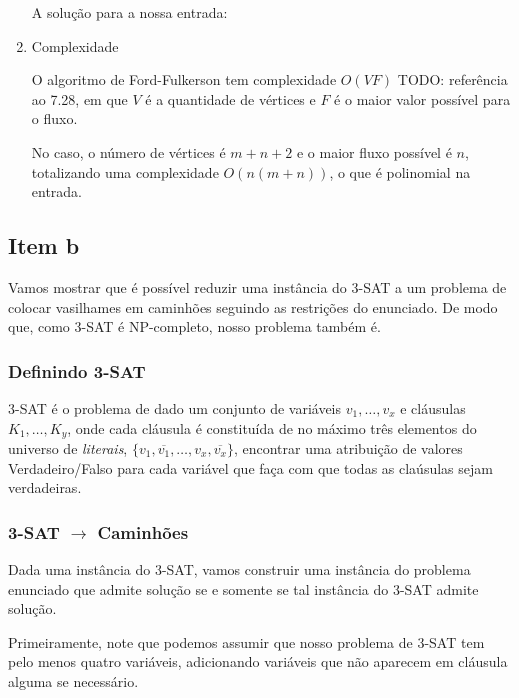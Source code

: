 \documentclass[11pt]{article}
\begin{document}
\begin{enumerate}
A solução para a nossa entrada:

\item Complexidade
\label{sec-5-2-1-2}

O algoritmo de Ford-Fulkerson tem complexidade $O(VF)$ TODO:
referência ao 7.28, em que $V$ é a quantidade de vértices e $F$ é o
maior valor possível para o fluxo.

No caso, o número de vértices é $m + n + 2$ e o maior fluxo possível é
$n$, totalizando uma complexidade $O(n(m + n))$, o que é polinomial na
entrada.
\end{enumerate}

\subsection{Item b}
\label{sec-5-3}

Vamos mostrar que é possível reduzir uma instância do 3-SAT a um
problema de colocar vasilhames em caminhões seguindo as restrições do
enunciado. De modo que, como 3-SAT é NP-completo, nosso problema
também é.

\subsubsection{Definindo 3-SAT}
\label{sec-5-3-1}

3-SAT é o problema de dado um conjunto de variáveis $v_1, \ldots, v_x$
e cláusulas $K_1, \ldots, K_y$, onde cada cláusula é constituída de no
máximo três elementos do universo de \textit{literais}, $\{v_1,
\overline{v_1}, \ldots, v_x, \overline{v_x}\}$, encontrar uma
atribuição de valores Verdadeiro/Falso para cada variável
que faça com que todas as claúsulas sejam verdadeiras.

\subsubsection{3-SAT $\to$ Caminhões}
\label{sec-5-3-2}

Dada uma instância do 3-SAT, vamos construir uma instância do problema
enunciado que admite solução se e somente se tal
instância do 3-SAT admite solução.

Primeiramente, note que podemos assumir que nosso
problema de 3-SAT tem pelo menos quatro variáveis, adicionando
variáveis que não aparecem em cláusula alguma se necessário.
\end{document}
